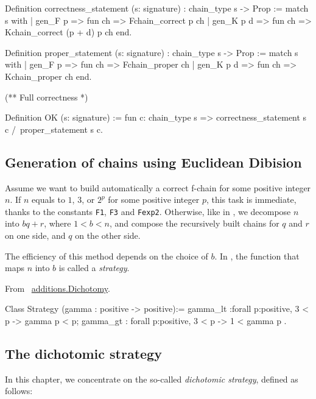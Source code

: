 \begin{Coqsrc}
Definition correctness_statement (s: signature) : 
chain_type s -> Prop :=
match s  with
  | gen_F p => fun ch => Fchain_correct p ch
  | gen_K p d   => fun ch => Kchain_correct (p + d) p ch
end.

Definition proper_statement (s: signature) : 
chain_type s -> Prop :=
match s  with
  | gen_F p => fun ch => Fchain_proper ch 
  | gen_K p d   => fun ch => Kchain_proper ch 
end.

(**  Full correctness *)

Definition  OK (s: signature) 
  := fun c: chain_type s => 
       correctness_statement s c /\
       proper_statement s c.

\end{Coqsrc}

\subsection{Generation of chains using Euclidean Dibision}

Assume we want to build automatically a correct  f-chain for some 
positive integer $n$.
If $n$ equals to $1$, $3$, or $2^p$ for some positive integer  $p$,
this task is immediate, thanks to the constants \texttt{F1}, 
\texttt{F3} and \texttt{Fexp2}.
Otherwise, like in \cite{DBLP:journals/ita/BrlekCHM95}, we decompose 
$n$ into $bq+r$, where $1<b<n$, and compose the recursively built
chains for $q$ and $r$ on one side, and $q$ on the other side.

The efficiency of this method depends on the choice of $b$.
In \cite{DBLP:journals/ita/BrlekCHM95}, the function that maps $n$ into $b$
is called a \emph{strategy}. 

\vspace{4pt}
\noindent
From ~\href{../theories/html/hydras.additions.Dichotomy.html}{additions.Dichotomy}.
\begin{Coqsrc}
Class Strategy (gamma : positive -> positive):=
{
gamma_lt :forall p:positive, 3 < p -> gamma  p < p;
gamma_gt : forall p:positive, 3 < p -> 1 < gamma  p
}.

\end{Coqsrc}
\subsection{The dichotomic strategy}


In this chapter, we concentrate
on the so-called \emph{dichotomic strategy}, defined as follows:

